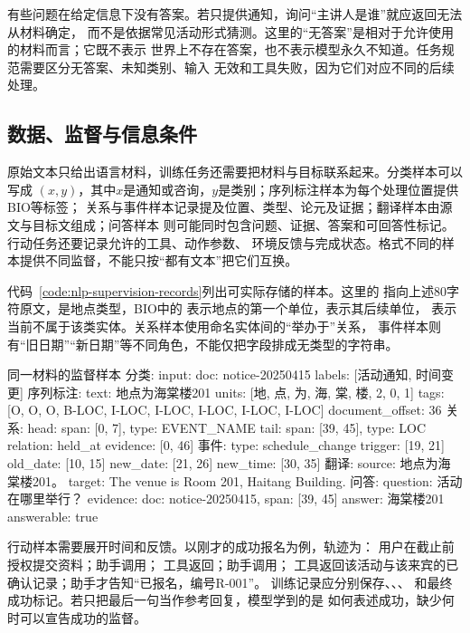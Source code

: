 有些问题在给定信息下没有答案。若只提供通知，询问“主讲人是谁”就应返回无法从材料确定，
而不是依据常见活动形式猜测。这里的“无答案”是相对于允许使用的材料而言；它既不表示
世界上不存在答案，也不表示模型永久不知道。任务规范需要区分无答案、未知类别、输入
无效和工具失败，因为它们对应不同的后续处理。

\subsection{数据、监督与信息条件}
\label{sec:nlp-data-supervision-conditions}

原始文本只给出语言材料，训练任务还需要把材料与目标联系起来。分类样本可以写成
$(x,y)$，其中$x$是通知或咨询，$y$是类别；序列标注样本为每个处理位置提供BIO等标签；
关系与事件样本记录提及位置、类型、论元及证据；翻译样本由源文与目标文组成；问答样本
则可能同时包含问题、证据、答案和可回答性标记。行动任务还要记录允许的工具、动作参数、
环境反馈与完成状态。格式不同的样本提供不同监督，不能只按“都有文本”把它们互换。

代码~\ref{code:nlp-supervision-records}列出可实际存储的样本。这里的
指向上述80字符原文，是地点类型，BIO中的
表示地点的第一个单位，表示其后续单位，
表示当前不属于该类实体。关系样本使用命名实体间的“举办于”关系，
事件样本则有“旧日期”“新日期”等不同角色，不能仅把字段排成无类型的字符串。

\begin{codeblock}[label={code:nlp-supervision-records}]{同一材料的监督样本}
分类:
  input: {doc: notice-20250415}
  labels: [活动通知, 时间变更]
序列标注:
  text: 地点为海棠楼201
  units: [地, 点, 为, 海, 棠, 楼, 2, 0, 1]
  tags: [O, O, O, B-LOC, I-LOC, I-LOC,
         I-LOC, I-LOC, I-LOC]
  document_offset: 36
关系:
  head: {span: [0, 7], type: EVENT_NAME}
  tail: {span: [39, 45], type: LOC}
  relation: held_at
  evidence: [0, 46]
事件:
  type: schedule_change
  trigger: [19, 21]
  old_date: [10, 15]
  new_date: [21, 26]
  new_time: [30, 35]
翻译:
  source: 地点为海棠楼201。
  target: The venue is Room 201, Haitang Building.
问答:
  question: 活动在哪里举行？
  evidence: {doc: notice-20250415, span: [39, 45]}
  answer: 海棠楼201
  answerable: true
\end{codeblock}

行动样本需要展开时间和反馈。以刚才的成功报名为例，轨迹为：
用户在截止前授权提交资料；助手调用；
工具返回；助手调用；
工具返回该活动与该来宾的已确认记录；助手才告知“已报名，编号R-001”。
训练记录应分别保存、、、
和最终成功标记。若只把最后一句当作参考回复，模型学到的是
如何表述成功，缺少何时可以宣告成功的监督。

